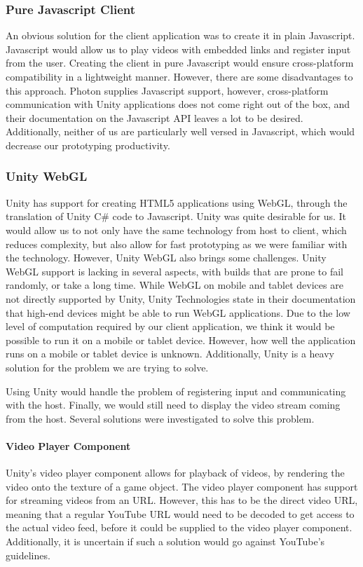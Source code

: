 \subsubsection{Pure Javascript Client}
An obvious solution for the client application was to create it in plain Javascript. Javascript would allow us to play videos with embedded links and register input from the user. Creating the client in pure Javascript would ensure cross-platform compatibility in a lightweight manner. However, there are some disadvantages to this approach. Photon supplies Javascript support, however, cross-platform communication with Unity applications does not come right out of the box\cite{photon_javascript}, and their documentation on the Javascript API leaves a lot to be desired. Additionally, neither of us are particularly well versed in Javascript, which would decrease our prototyping productivity. 

\subsubsection{Unity WebGL}
Unity has support for creating HTML5 applications using WebGL\cite{unity_webgl}, through the translation of Unity C\# code to Javascript. Unity was quite desirable for us. It would allow us to not only have the same technology from host to client, which reduces complexity, but also allow for fast prototyping as we were familiar with the technology. 
However, Unity WebGL also brings some challenges. Unity WebGL support is lacking in several aspects, with builds that are prone to fail randomly, or take a long time. While WebGL on mobile and tablet devices are not directly supported by Unity, Unity Technologies state in their documentation that high-end devices might be able to run WebGL applications\cite{unity_webl_browser_support}. Due to the low level of computation required by our client application, we think it would be possible to run it on a mobile or tablet device. However, how well the application runs on a mobile or tablet device is unknown. Additionally, Unity is a heavy solution for the problem we are trying to solve.

Using Unity would handle the problem of registering input and communicating with the host. Finally, we would still need to display the video stream coming from the host. Several solutions were investigated to solve this problem.

\paragraph{Video Player Component}
Unity's video player component allows for playback of videos, by rendering the video onto the texture of a game object\cite{unity_video_player}. The video player component has support for streaming videos from an URL. However, this has to be the direct video URL, meaning that a regular YouTube URL would need to be decoded to get access to the actual video feed, before it could be supplied to the video player component. Additionally, it is uncertain if such a solution would go against YouTube's guidelines\cite[5.1 A]{youtube_guidelines}.

